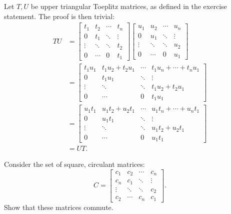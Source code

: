 \begin{solution}
  Let $T,U$ be upper triangular Toeplitz matrices, as defined in the exercise statement.
  The proof is then trivial:
  \begin{align*}
    TU
    & =
    \begin{bmatrix}
      t_1 & t_2 & \cdots & t_n\\
      0   & t_1 & \ddots & \vdots\\
      \vdots & \ddots & \ddots & t_2\\
      0 & \cdots & 0 & t_1
    \end{bmatrix}
    \begin{bmatrix}
      u_1 & u_2 & \cdots & u_n\\
      0   & u_1 & \ddots & \vdots\\
      \vdots & \ddots & \ddots & u_2\\
      0 & \cdots & 0 & u_1
    \end{bmatrix}\\
    & =
    \begin{bmatrix}
      t_1u_1 & t_1u_2 + t_2u_1 & \cdots & t_1u_n + \cdots + t_nu_1\\
      0   & t_1u_1 & \ddots & \vdots\\
      \vdots & \ddots & \ddots & t_1u_2 + t_2u_1\\
      0 & \cdots & 0 & t_1u_1
    \end{bmatrix}\\
    & =
    \begin{bmatrix}
      u_1t_1 & u_1t_2 + u_2t_1 & \cdots & u_1t_n + \cdots + u_nt_1\\
      0   & u_1t_1 & \ddots & \vdots\\
      \vdots & \ddots & \ddots & u_1t_2 + u_2t_1\\
      0 & \cdots & 0 & u_1t_1
    \end{bmatrix}\\
    & = UT.
  \end{align*}
\end{solution}

Consider the set of square, circulant matrices:
\[
  C =
  \begin{bmatrix}
    c_1 & c_2 & \cdots & c_n\\
    c_n & c_1 & \ddots & \vdots\\
    \vdots & \ddots & \ddots & c_2\\
    c_2 & \cdots & c_n & c_1
  \end{bmatrix}.
\]
Show that these matrices commute.

